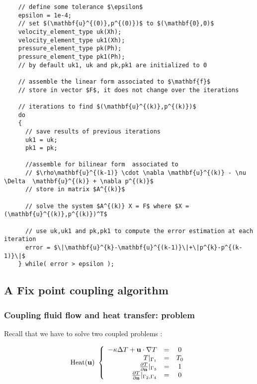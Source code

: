   \begin{lstlisting}
    // define some tolerance $\epsilon$
    epsilon = 1e-4;
    // set $(\mathbf{u}^{(0)},p^{(0)})$ to $(\mathbf{0},0)$
    velocity_element_type uk(Xh);
    velocity_element_type uk1(Xh);
    pressure_element_type pk(Ph);
    pressure_element_type pk1(Ph);
    // by default uk1, uk and pk,pk1 are initialized to 0

    // assemble the linear form associated to $\mathbf{f}$
    // store in vector $F$, it does not change over the iterations

    // iterations to find $(\mathbf{u}^{(k)},p^{(k)})$
    do
    {
      // save results of previous iterations
      uk1 = uk;
      pk1 = pk;

      //assemble for bilinear form  associated to
      // $\rho\mathbf{u}^{(k-1)} \cdot \nabla \mathbf{u}^{(k)} - \nu \Delta  \mathbf{u}^{(k)} + \nabla p^{(k)}$
      // store in matrix $A^{(k)}$

      // solve the system $A^{(k)} X = F$ where $X = (\mathbf{u}^{(k)},p^{(k)})^T$

      // use uk,uk1 and pk,pk1 to compute the error estimation at each iteration
      error = $\|\mathbf{u}^{k}-\mathbf{u}^{(k-1)}\|+\|p^{k}-p^{(k-1)}\|$
    } while( error > epsilon );

  \end{lstlisting}

\subsection{A Fix point coupling algorithm}
\label{sec:coupling-algorithm}

\subsubsection{Coupling fluid flow and heat transfer: problem}
  Recall that we have to solve two coupled problems :

  $$
  \mbox{Heat(\textbf{u}) }\left\{
  \begin{array}{rcc}
    - \kappa\Delta T + \mathbf{u}\cdot\nabla T &=& 0 \\
    T|_{\Gamma_1} &=& T_0 \\
    \frac{\partial T}{\partial \mathbf{n}}|_{\Gamma_3} &=&1 \\
    \frac{\partial T}{\partial \mathbf{n}}|_{\Gamma_2,\Gamma_4} &=& 0
  \end{array}
  \right.
  $$

